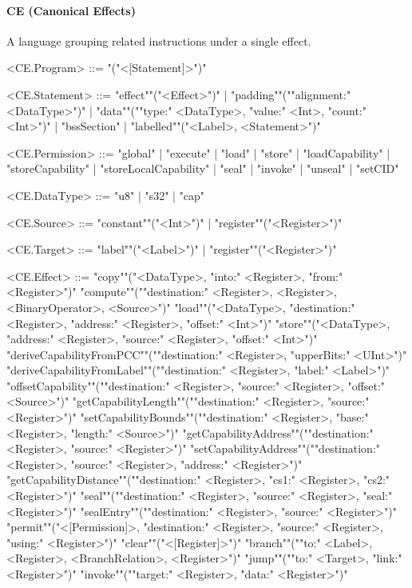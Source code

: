 \documentclass[main.tex]{subfiles}
\begin{document}
\paragraph{ CE (Canonical Effects) } A language grouping related instructions under a single effect.
\begin{grammar}
	\footnotesize
				<CE.Program> ::=
							"("<[Statement]>")"
				\par
				<CE.Statement> ::=
						"effect""("<Effect>")"
						| "padding""(""alignment:" <DataType>")"
						| "data""(""type:" <DataType>, "value:" <Int>, "count:" <Int>")"
						| "bssSection"
						| "labelled""("<Label>, <Statement>")"
				\par
				<CE.Permission> ::=
						"global"
						| "execute"
						| "load"
						| "store"
						| "loadCapability"
						| "storeCapability"
						| "storeLocalCapability"
						| "seal"
						| "invoke"
						| "unseal"
						| "setCID"
				\par
				<CE.DataType> ::=
						"u8"
						| "s32"
						| "cap"
				\par
				<CE.Source> ::=
						"constant""("<Int>")"
						| "register""("<Register>")"
				\par
				<CE.Target> ::=
						"label""("<Label>")"
						| "register""("<Register>")"
				\par
				<CE.Effect> ::=
						"copy""("<DataType>, "into:" <Register>, "from:" <Register>")"
						\alt "compute""(""destination:" <Register>, <Register>, <BinaryOperator>, <Source>")"
						\alt "load""("<DataType>, "destination:" <Register>, "address:" <Register>, "offset:" <Int>")"
						\alt "store""("<DataType>, "address:" <Register>, "source:" <Register>, "offset:" <Int>")"
						\alt "deriveCapabilityFromPCC""(""destination:" <Register>, "upperBits:" <UInt>")"
						\alt "deriveCapabilityFromLabel""(""destination:" <Register>, "label:" <Label>")"
						\alt "offsetCapability""(""destination:" <Register>, "source:" <Register>, "offset:" <Source>")"
						\alt "getCapabilityLength""(""destination:" <Register>, "source:" <Register>")"
						\alt "setCapabilityBounds""(""destination:" <Register>, "base:" <Register>, "length:" <Source>")"
						\alt "getCapabilityAddress""(""destination:" <Register>, "source:" <Register>")"
						\alt "setCapabilityAddress""(""destination:" <Register>, "source:" <Register>, "address:" <Register>")"
						\alt "getCapabilityDistance""(""destination:" <Register>, "cs1:" <Register>, "cs2:" <Register>")"
						\alt "seal""(""destination:" <Register>, "source:" <Register>, "seal:" <Register>")"
						\alt "sealEntry""(""destination:" <Register>, "source:" <Register>")"
						\alt "permit""("<[Permission]>, "destination:" <Register>, "source:" <Register>, "using:" <Register>")"
						\alt "clear""("<[Register]>")"
						\alt "branch""(""to:" <Label>, <Register>, <BranchRelation>, <Register>")"
						\alt "jump""(""to:" <Target>, "link:" <Register>")"
						\alt "invoke""(""target:" <Register>, "data:" <Register>")"
				\par
\end{grammar}
\par
\end{document}
